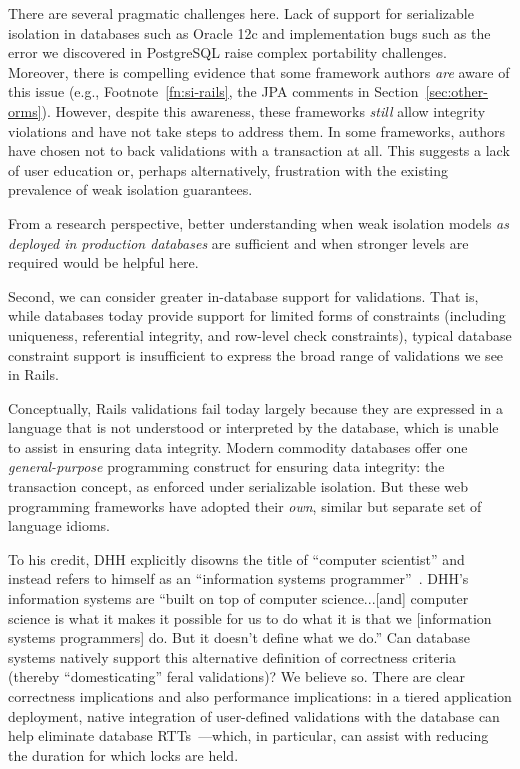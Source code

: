 There are several pragmatic challenges here. Lack of support for
serializable isolation in databases such as Oracle 12c and
implementation bugs such as the error we discovered in PostgreSQL
raise complex portability challenges. Moreover, there is compelling
evidence that some framework authors \textit{are} aware of this issue
(e.g., Footnote~\ref{fn:si-rails}, the JPA comments in
Section~\ref{sec:other-orms}). However, despite this awareness, these
frameworks \textit{still} allow integrity violations and have not take
steps to address them. In some frameworks, authors have chosen not to
back validations with a transaction at all. This suggests a lack of
user education or, perhaps alternatively, frustration with the existing
prevalence of weak isolation guarantees.

From a research perspective, better understanding when weak isolation models
\textit{as deployed in production databases} are sufficient and
when stronger levels are required would be helpful here.

 Second, we can consider
greater in-database support for validations. That is, while databases
today provide support for limited forms of constraints (including
uniqueness, referential integrity, and row-level check constraints),
typical database constraint support is insufficient to express the
broad range of validations we see in Rails.

Conceptually, Rails validations fail today largely because they are
expressed in a language that is not understood or interpreted by the
database, which is unable to assist in ensuring data integrity. Modern
commodity databases offer one \textit{general-purpose} programming
construct for ensuring data integrity: the transaction concept, as
enforced under serializable isolation. But these web programming
frameworks have adopted their \textit{own}, similar but separate set
of language idioms.

To his credit, DHH explicitly disowns the title of ``computer
scientist'' and instead refers to himself as an ``information systems
programmer''~\cite{dhh-keynote}. DHH's information systems are ``built
on top of computer science...[and] computer science is what it makes
it possible for us to do what it is that we [information systems
programmers] do. But it doesn't define what we do.'' Can database
systems natively support this alternative definition of correctness
criteria (thereby ``domesticating'' feral validations)? We believe
so. There are clear correctness implications and also performance
implications: in a tiered application deployment, native integration
of user-defined validations with the database can help eliminate
database RTTs~\cite{pyxis}---which, in particular, can assist with
reducing the duration for which locks are held.

